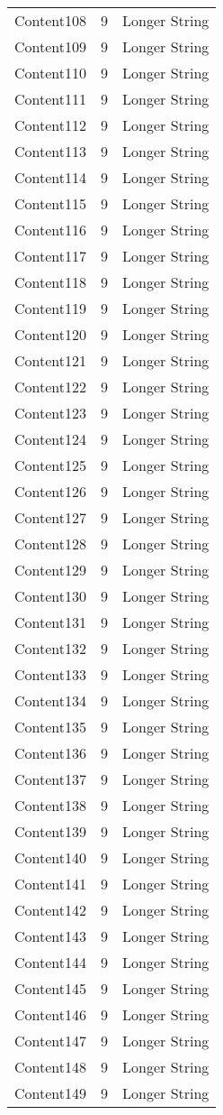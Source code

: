 \documentclass{article}%
\begin{document}
\begin{longtable}{l l l}
Content108&9&Longer String\\%
Content109&9&Longer String\\%
Content110&9&Longer String\\%
Content111&9&Longer String\\%
Content112&9&Longer String\\%
Content113&9&Longer String\\%
Content114&9&Longer String\\%
Content115&9&Longer String\\%
Content116&9&Longer String\\%
Content117&9&Longer String\\%
Content118&9&Longer String\\%
Content119&9&Longer String\\%
Content120&9&Longer String\\%
Content121&9&Longer String\\%
Content122&9&Longer String\\%
Content123&9&Longer String\\%
Content124&9&Longer String\\%
Content125&9&Longer String\\%
Content126&9&Longer String\\%
Content127&9&Longer String\\%
Content128&9&Longer String\\%
Content129&9&Longer String\\%
Content130&9&Longer String\\%
Content131&9&Longer String\\%
Content132&9&Longer String\\%
Content133&9&Longer String\\%
Content134&9&Longer String\\%
Content135&9&Longer String\\%
Content136&9&Longer String\\%
Content137&9&Longer String\\%
Content138&9&Longer String\\%
Content139&9&Longer String\\%
Content140&9&Longer String\\%
Content141&9&Longer String\\%
Content142&9&Longer String\\%
Content143&9&Longer String\\%
Content144&9&Longer String\\%
Content145&9&Longer String\\%
Content146&9&Longer String\\%
Content147&9&Longer String\\%
Content148&9&Longer String\\%
Content149&9&Longer String\\%
\end{longtable}%
\end{document}
